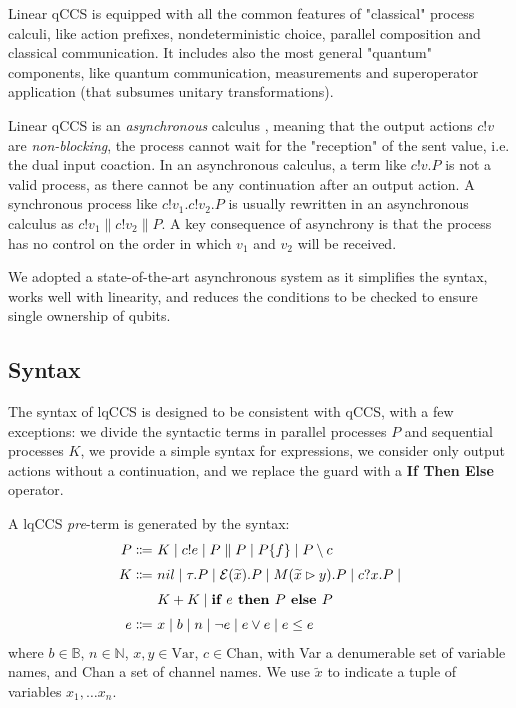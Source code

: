 Linear qCCS is equipped with all the common features of "classical" process calculi, like action prefixes, nondeterministic choice, parallel composition and classical communication. It includes also the most general "quantum" components, like quantum communication, measurements and superoperator application (that subsumes unitary transformations). 


Linear qCCS is an \textit{asynchronous} calculus  \cite{boudolAsynchronyPicalculus1992}, meaning that the output actions $c!v$ are \textit{non-blocking}, the process cannot wait for the "reception" of the sent value, i.e. the dual input coaction. In an asynchronous calculus, a term like $c!v.P$ is not a valid process, as there cannot be any continuation after an output action. A synchronous process like $c!v_1.c!v_2.P$ is usually rewritten in an asynchronous calculus as $c!v_1 \parallel c!v_2 \parallel P$. A key consequence of asynchrony is that the process has no control on the order in which $v_1$ and $v_2$ will be received.

We adopted a state-of-the-art asynchronous system as it simplifies the syntax, works well with linearity, and reduces the conditions to be checked to ensure single ownership of qubits.

\subsection{Syntax}

The syntax of lqCCS is designed to be consistent with qCCS, with a few exceptions: we divide the syntactic terms in parallel processes $P$ and sequential processes $K$, we provide a simple syntax for expressions, we consider only output actions without a continuation, and we replace the guard with a \textbf{If Then Else} operator.

A lqCCS \textit{pre}-term is generated by the syntax:
\begin{align*}
  P \Coloneqq &\ K \mid c!e \mid P \parallel P  \mid  P \{f\} \mid P \setminus c\\[0.1cm]
  K \Coloneqq &\ nil \mid \tau . P \mid \mathcal{E}(\widetilde{x}) . P \mid M(\widetilde{x} \rhd y) . P \mid c?x . P \mid \\[0.1cm]
  &\ K + K \mid \textbf{if } e \textbf{ then } P \textbf{ else } P \\[0.1cm]
  e \Coloneqq &\ x \mid b \mid n \mid \neg e \mid e \lor e \mid e \leq e
\end{align*}	
where $b \in \mathbb{B}$, $n \in \mathbb{N}$, $x, y \in \text{Var}$, $c \in \text{Chan}$, with Var a denumerable set of variable names, and Chan a set of channel names. We use $\widetilde{x}$ to indicate a tuple of variables $x_1, \ldots x_n$.

